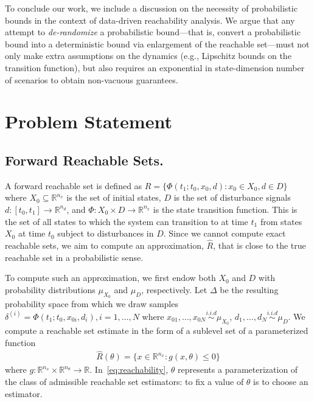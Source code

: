 \documentclass[letterpaper, 10 pt, conference]{ieeeconf}  %
\begin{document}
To conclude our work, we include a discussion on the necessity of probabilistic bounds 
in the context of data-driven reachability analysis. We argue that any attempt to \emph{de-randomize} a probabilistic bound---that is, convert a probabilistic bound into a deterministic bound via enlargement of the reachable set---must not only make extra assumptions on the dynamics (e.g., Lipschitz bounds on the transition function), but also requires an exponential in state-dimension number of scenarios to obtain non-vacuous guarantees.




\section{Problem Statement}
\label{prelim}

\subsection{Forward Reachable Sets.} A forward reachable set is defined as $R = \{\Phi(t_1;t_0, x_0, d) : x_0 \in X_0, d \in D\}$ where $X_0 \subseteq \mathbb{R}^{n_x}$ is the set of initial states, $D$ is the set of disturbance signals $d: [t_0, t_1] \rightarrow \mathbb{R}^{n_d}$, and $\Phi : X_0 \times D \rightarrow \mathbb{R}^{n_x}$ is the state transition function. This is the set of all states to which the system can transition to at time $t_1$ from states $X_0$ at time $t_0$ subject to disturbances in $D$. Since we cannot compute exact reachable sets, we aim to compute an approximation, $\hat{R}$, that is close to the true reachable set in a probabilistic sense.

To compute such an approximation, we first endow both $X_0$ and $D$ with probability distributions $\mu_{X_0}$ and $\mu_D$, respectively. Let $\Delta$ be the resulting probability space from which we draw samples $\delta^{(i)} =\Phi(t_1;t_0, x_{0i}, d_i), i = 1, \dotsc, N $ where $x_{01}, \dotsc, x_{0N} \overset{i.i.d}{\sim} \mu_{X_0}$, $d_1, \dotsc, d_N \overset{i.i.d}{\sim} \mu_{D}$. We compute a reachable set estimate in the form of a sublevel set of a parameterized function 
\begin{equation}
\label{eq:reachability}
\begin{aligned}
\hat{R}(\theta) = \{x \in \mathbb{R}^{n_x} : g(x, \theta) \leq 0\}
\end{aligned}
\end{equation} 
where $g : \mathbb{R}^{n_x} \times \mathbb{R}^{n_{\theta}} \rightarrow \mathbb{R}$. In~\eqref{eq:reachability}, $\theta$ represents a parameterization of the class of admissible reachable set estimators: to fix a value of $\theta$ is to choose an estimator. 
\end{document}
